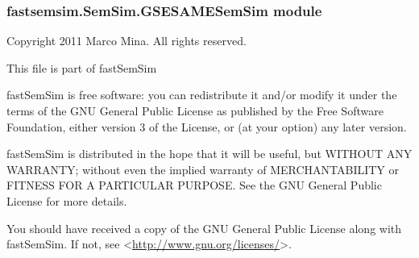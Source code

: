 \documentclass[letterpaper,10pt,english]{sphinxmanual}
\begin{document}
\subsubsection{fastsemsim.SemSim.GSESAMESemSim module}
\label{fastsemsim.SemSim:module-fastsemsim.SemSim.GSESAMESemSim}\label{fastsemsim.SemSim:fastsemsim-semsim-gsesamesemsim-module}
Copyright 2011 Marco Mina. All rights reserved.

This file is part of fastSemSim

fastSemSim is free software: you can redistribute it and/or modify
it under the terms of the GNU General Public License as published by
the Free Software Foundation, either version 3 of the License, or
(at your option) any later version.

fastSemSim is distributed in the hope that it will be useful,
but WITHOUT ANY WARRANTY; without even the implied warranty of
MERCHANTABILITY or FITNESS FOR A PARTICULAR PURPOSE.  See the
GNU General Public License for more details.

You should have received a copy of the GNU General Public License
along with fastSemSim.  If not, see \textless{}\href{http://www.gnu.org/licenses/}{http://www.gnu.org/licenses/}\textgreater{}.
\end{document}
